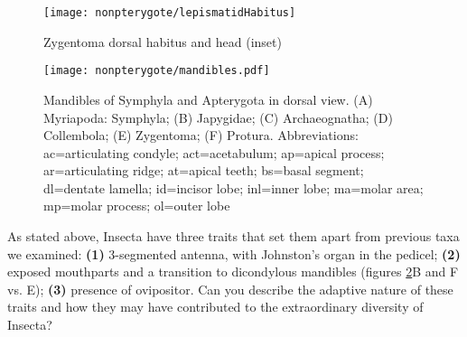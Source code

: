 \begin{figure}[ht!]
  \centering
    \texttt{[image: nonpterygote/lepismatidHabitus]}
  \caption{Zygentoma dorsal habitus and head (inset) \citep[redrawn from][Figs. 1, 10]{bhlpart1409lepismat}}
  \label{fig:zygenhabit}
\end{figure}

\begin{figure}[ht!]
  \centering
    \texttt{[image: nonpterygote/mandibles.pdf]}
  \caption{Mandibles of Symphyla and Apterygota in dorsal view. (A) Myriapoda: Symphyla; (B) Japygidae; (C) Archaeognatha; (D) Collembola; (E) Zygentoma; (F) Protura. Abbreviations: ac=articulating condyle; act=acetabulum; ap=apical process; ar=articulating ridge; at=apical teeth; bs=basal segment; dl=dentate lamella; id=incisor lobe; inl=inner lobe; ma=molar area; mp=molar process; ol=outer lobe \citep[redrawn from][Fig. 1]{bhlpart81512}}
  \label{fig:mandibles}
\end{figure}

\begin{theo}
{}As stated above, Insecta have three traits that set them apart from previous taxa we examined: \textbf{(1)} 3-segmented antenna, with Johnston's organ in the pedicel; \textbf{(2)} exposed mouthparts and a transition to dicondylous mandibles (figures \ref{fig:mandibles}B and F vs. E); \textbf{(3)} presence of ovipositor. Can you describe the adaptive nature of these traits and how they may have contributed to the extraordinary diversity of Insecta?
\end{theo}

\clearpage
\thispagestyle{empty}
